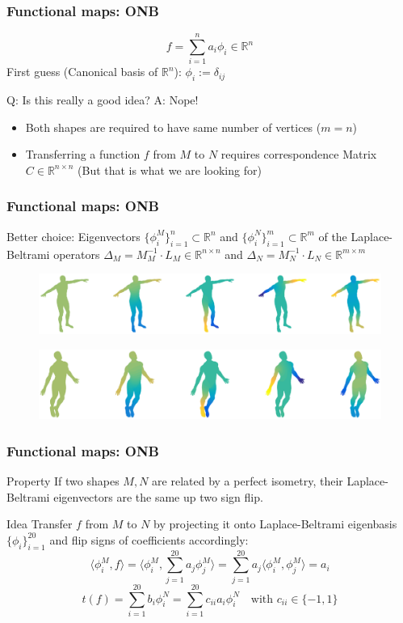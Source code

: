 \documentclass[compress]{beamer}
\begin{document}
\begin{frame}[fragile]
\frametitle{Functional maps: ONB}
$$
	f = \sum_{i=1}^{n} a_i\phi_i \in \mathbb{R}^n
$$
First guess (Canonical basis of $\mathbb{R}^n$): $\phi_i := \delta_{ij}$ \\

\begin{block}{}
Q: Is this really a good idea? A: Nope!
\begin{itemize}
	\item Both shapes are required to have same number of vertices ($m=n$)
	\item Transferring a function $f$ from $M$ to $N$ requires correspondence Matrix $C\in \mathbb{R}^{n \times n}$ (But that is what we are looking for)
\end{itemize}
\end{block}
\end{frame}

\begin{frame}[fragile]
\frametitle{Functional maps: ONB}
Better choice:
Eigenvectors $\{\phi^M_i\}_{i=1}^n \subset \mathbb{R}^n$ and $\{\phi^N_i\}_{i=1}^m \subset \mathbb{R}^m$ of the Laplace-Beltrami operators $\Delta_M=M_M^{-1} \cdot L_M \in \mathbb{R}^{n \times n}$ and $\Delta_N=M_N^{-1} \cdot L_N \in \mathbb{R}^{m \times m}$
\begin{figure}[h]
	\centering
	\includegraphics[width=1.0\textwidth]{Michael.eps}
\end{figure}
  \begin{figure}[h]
	\centering
	\includegraphics[width=1.0\textwidth]{Michael1.eps}
\end{figure}

\end{frame}

\begin{frame}[fragile]
\frametitle{Functional maps: ONB}
\begin{block}{Property}
If two shapes $M, N$ are related by a perfect isometry, their Laplace-Beltrami eigenvectors are the same up two sign flip.
\end{block}
\begin{block}{Idea}
Transfer $f$ from $M$ to $N$ by projecting it onto Laplace-Beltrami eigenbasis $\{\phi_i\}_{i=1}^{20}$ and flip signs of coefficients accordingly:
$$
	 \langle \phi_i^M, f \rangle = \langle \phi_i^M, \sum_{j=1}^{20} a_j\phi_j^M \rangle = \sum_{j=1}^{20} a_j \langle \phi_i^M, \phi_j^M  \rangle = a_i 
$$
$$
	t(f) = \sum_{i=1}^{20} b_i \phi_i^N = \sum_{i=1}^{20} c_{ii} a_i \phi_i^N \quad \text{with } c_{ii} \in \{-1, 1\} 
$$
\end{block}
\end{frame}
\end{document}
